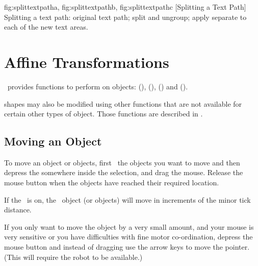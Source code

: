 {
  {fig:splittextpatha}{}{},
  {fig:splittextpathb}{}{},
  {fig:splittextpathc}{}{}
}
[Splitting a Text Path]
{Splitting a text path:
 original text path;
 split and ungroup;
 apply
separate  to each of the new text areas.}


\chapter{Affine Transformations}\label{sec:affinetrans}

\FlowframTk\ provides functions to perform 
 on \glspl{object}:
 (), 
 (), 
 () and 
 ().

\Glspl{shape} may also be modified using other functions
that are not available for certain other types of \gls{object}. Those
functions are described in .

\section{Moving an Object}\label{sec:moveobjects}

To move an \gls{object} or \glspl*{object}, first \select\ the
\glspl*{object} you want to move and then depress the
 somewhere inside the
selection, and drag the mouse.  Release the mouse button when the
\glspl*{object} have reached their required location.

\begin{important}
If the \gridlock\ is on, the \selected\
\gls{object} (or \glspl{object}) will move
in increments of the minor tick distance.
\end{important}

If you only want to move the object by a very small amount, and your
mouse is very sensitive or you have difficulties with fine motor
co-ordination, depress the mouse button and instead of dragging use
the arrow keys to move the pointer. (This will require the
\gls{robot} to be available.)

